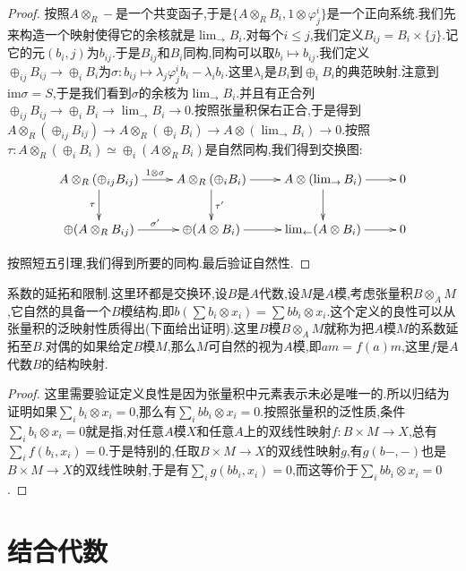 \begin{enumerate}
\begin{proof}
    	按照$A\otimes_R-$是一个共变函子,于是$\{A\otimes_RB_i,1\otimes\varphi_j^i\}$是一个正向系统.我们先来构造一个映射使得它的余核就是$\lim_{\rightarrow}B_i$.对每个$i\le j$,我们定义$B_ {ij}=B_i\times\{j\}$.记它的元$(b_i,j)$为$b_{ij}$.于是$B_ {ij}$和$B_i$同构,同构可以取$b_i\mapsto b_{ij}$.我们定义$\oplus_ {ij}B_{ij}\to\oplus_iB_i$为$\sigma:b_{ij}\mapsto\lambda_j\varphi_j^ib_i-\lambda_ib_i$.这里$\lambda_i$是$B_i$到$\oplus_iB_i$的典范映射.注意到$\mathrm{im}\sigma=S$,于是我们看到$\sigma$的余核为$\lim_ {\rightarrow}B_i$.并且有正合列$\oplus_ {ij}B_{ij}\to\oplus_iB_i\to\lim_{\rightarrow}B_i\to0$.按照张量积保右正合,于是得到$A\otimes_R\left(\oplus_ {ij}B_{ij}\right)\to A\otimes_R\left(\oplus_iB_i\right)\to A\otimes\left(\lim_{\rightarrow}B_i\right)\to0$.按照$\tau:A\otimes_R\left(\oplus_ {i}B_{i}\right)\simeq\oplus_i\left(A\otimes_RB_i\right)$是自然同构,我们得到交换图:
    	$$\xymatrix{
    		A\otimes_R\left(\oplus_ {ij}B_{ij}\right)\ar[d]_{\tau}\ar[r]^{1\otimes\sigma}&A\otimes_R\left(\oplus_iB_i\right)\ar[r]\ar[d]^{\tau'}&A\otimes\left(\lim_{\rightarrow}B_i\right)\ar[r]\ar[d]&0\\
    		\oplus(A\otimes_RB_{ij})\ar[r]^{\sigma'}&\oplus(A\otimes B_i)\ar[r]&\lim_{\leftarrow}(A\otimes B_i)\ar[r]&0
    	}$$
    	
    	按照短五引理,我们得到所要的同构.最后验证自然性.
    \end{proof}
\end{enumerate}

系数的延拓和限制.这里环都是交换环,设$B$是$A$代数,设$M$是$A$模,考虑张量积$B\otimes_AM$,它自然的具备一个$B$模结构,即$b(\sum b_i\otimes x_i)=\sum bb_i\otimes x_i$.这个定义的良性可以从张量积的泛映射性质得出(下面给出证明).这里$B$模$B\otimes_AM$就称为把$A$模$M$的系数延拓至$B$.对偶的如果给定$B$模$M$,那么$M$可自然的视为$A$模,即$am=f(a)m$,这里$f$是$A$代数$B$的结构映射.
\begin{proof}
	
	这里需要验证定义良性是因为张量积中元素表示未必是唯一的.所以归结为证明如果$\sum_ib_i\otimes x_i=0$,那么有$\sum_ibb_i\otimes x_i=0$.按照张量积的泛性质,条件$\sum_ib_i\otimes x_i=0$就是指,对任意$A$模$X$和任意$A$上的双线性映射$f:B\times M\to X$,总有$\sum_if(b_i,x_i)=0$.于是特别的,任取$B\times M\to X$的双线性映射$g$,有$g(b-,-)$也是$B\times M\to X$的双线性映射,于是有$\sum_ig(bb_i,x_i)=0$,而这等价于$\sum_ibb_i\otimes x_i=0$.
\end{proof}
\newpage
\section{结合代数}
